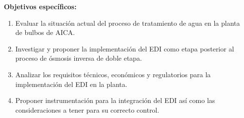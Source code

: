 \textbf{Objetivos específicos:}
\begin{enumerate}
      \item Evaluar la situación actual del proceso de
            tratamiento de agua en la planta de bulbos de AICA.
      \item Investigar y proponer la implementación del EDI
            como etapa posterior al proceso de ósmosis inversa de doble etapa.
      \item Analizar los requisitos técnicos, económicos y regulatorios
            para la implementación del EDI en la planta.
      \item Proponer instrumentación para la
            integración del EDI así como las consideraciones a tener para su
            correcto control.
\end{enumerate}